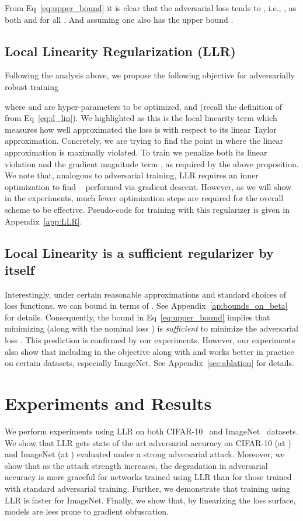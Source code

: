 \documentclass{article}
\theoremstyle{plain}
\theoremstyle{definition}
\theoremstyle{remark}
\begin{document}
From Eq~\eqref{eq:upper_bound} it is clear that the adversarial loss tends to , i.e., , as both  and  for all . And assuming  one also has the upper bound .



\subsection{Local Linearity Regularization (LLR)}
Following the analysis above, we propose the following objective for adversarially robust training

where  and  are hyper-parameters to be optimized, and 
 (recall the definition of  from Eq~\eqref{eq:d_lin}). We highlighted  as this is the local linearity term which measures how well approximated the loss is with respect to its linear Taylor approximation.
Concretely, we are trying to find the point  in  where the linear approximation  is maximally violated. To train we penalize both its linear violation  and the gradient magnitude term , as required by the above proposition. We note that, analogous to adversarial training, LLR requires an inner optimization to find  -- performed via gradient descent. However, as we will show in the experiments, much fewer optimization steps are required for the overall scheme to be effective.  Pseudo-code for training with this regularizer is given in Appendix~\ref{app:LLR}.

\subsection{Local Linearity  is a sufficient regularizer by itself}Interestingly, under certain reasonable approximations and standard choices of
loss functions, we can bound  in
terms of . See Appendix~\ref{ap:bounds_on_beta} for details. Consequently, the bound in Eq~\eqref{eq:upper_bound} implies that minimizing 
(along with the nominal loss ) is {\it sufficient} to minimize the adversarial
loss .
This prediction is confirmed by our experiments. However, our experiments also
show that including  in the objective along
with  and  works better in practice on certain
datasets, especially ImageNet. See Appendix~\ref{sec:ablation} for details.

 \section{Experiments and Results}
We perform experiments using LLR on both CIFAR-10~\citep{krizhevsky2009learning} and ImageNet~\citep{deng2009imagenet} datasets. We show that LLR gets state of the art adversarial accuracy on CIFAR-10 (at ) and ImageNet (at ) evaluated under a strong adversarial attack. Moreover, we show that as the attack strength increases, the degradation in adversarial accuracy is more graceful for networks trained using LLR than for those trained with standard adversarial training. Further, we demonstrate that training using LLR is  faster for ImageNet. Finally, we show that, by linearizing the loss surface, models are less prone to gradient obfuscation.
\end{document}
